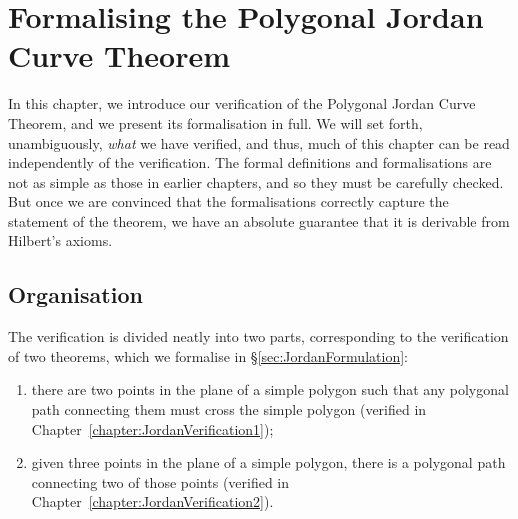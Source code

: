 \chapter{Formalising the Polygonal Jordan Curve Theorem}\label{chapter:JordanFormalisation}

In this chapter, we introduce our verification of the Polygonal Jordan Curve Theorem, and we present its formalisation in full. We will set forth, unambiguously, \emph{what} we have verified, and thus, much of this chapter can be read independently of the verification. The formal definitions and formalisations are not as simple as those in earlier chapters, and so they must be carefully checked. But once we are convinced that the formalisations correctly capture the statement of the theorem, we have an absolute guarantee that it is derivable from Hilbert's axioms.

\section{Organisation}
The verification is divided neatly into two parts, corresponding to the verification of two theorems, which we formalise in \S\ref{sec:JordanFormulation}:
\begin{enumerate}
  \item there are two points in the plane of a simple polygon such that any polygonal path connecting them must cross the simple polygon (verified in Chapter~\ref{chapter:JordanVerification1});
  \item given three points in the plane of a simple polygon, there is a polygonal path connecting two of those points (verified in Chapter~\ref{chapter:JordanVerification2}).
\end{enumerate}

